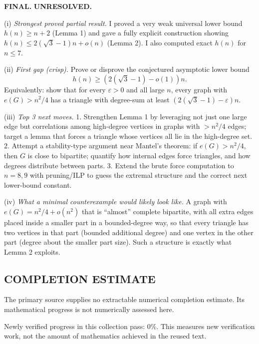\textbf{FINAL.} \textbf{UNRESOLVED.}

(i) \emph{Strongest proved partial result.} I proved a very weak universal lower bound $h(n)\ge n+2$ (Lemma 1) and gave a fully explicit construction showing $h(n)\le 2(\sqrt{3}-1)n+o(n)$ (Lemma 2).
I also computed exact $h(n)$ for $n\le 7$.

(ii) \emph{First gap (crisp).} Prove or disprove the conjectured asymptotic lower bound
\[h(n)\ge (2(\sqrt{3}-1)-o(1))n.\]
Equivalently: show that for every $\varepsilon>0$ and all large $n$, every graph with $e(G)>n^2/4$ has a triangle with degree-sum at least $(2(\sqrt{3}-1)-\varepsilon)n$.

(iii) \emph{Top 3 next moves.}
1. Strengthen Lemma 1 by leveraging not just one large edge but correlations among high-degree vertices in graphs with $>n^2/4$ edges; target a lemma that forces a triangle whose vertices all lie in the high-degree set.
2. Attempt a stability-type argument near Mantel's theorem: if $e(G)>n^2/4$, then $G$ is close to bipartite; quantify how internal edges force triangles, and how degrees distribute between parts.
3. Extend the brute force computation to $n=8,9$ with pruning/ILP to guess the extremal structure and the correct next lower-bound constant.

(iv) \emph{What a minimal counterexample would likely look like.} A graph with $e(G)=n^2/4+o(n^2)$ that is ``almost'' complete bipartite, with all extra edges placed inside a smaller part in a bounded-degree way, so that every triangle has two vertices in that part (bounded additional degree) and one vertex in the other part (degree about the smaller part size). Such a structure is exactly what Lemma 2 exploits.



\subsection*{COMPLETION ESTIMATE}
The primary source supplies no extractable numerical completion estimate. Its mathematical progress is not numerically assessed here.

Newly verified progress in this collection pass: $0\%$. This measures new verification work, not the amount of mathematics achieved in the reused text.
